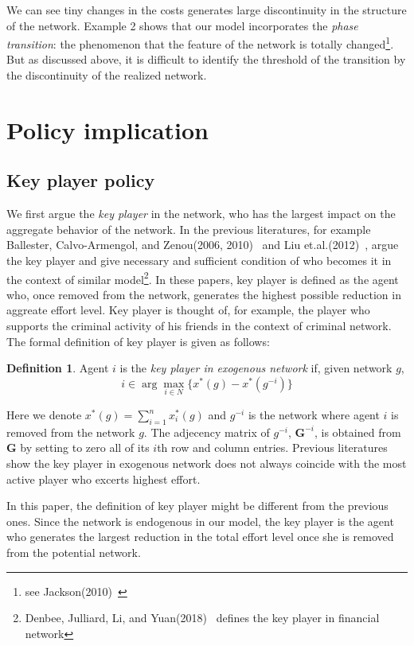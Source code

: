 \documentclass[12pt]{article}
\theoremstyle{definition}
\newtheorem{definition}{Definition}
\newcommand{\bm}[1]{\boldsymbol{#1}}
\begin{document}
We can see tiny changes in the costs generates large discontinuity in the structure of the network.
Example 2 shows that our model incorporates the {\it{phase transition}}: the phenomenon that the feature of the network is totally changed\footnote{see Jackson(2010)~\cite{social}}.
But as discussed above, it is difficult to identify the threshold of the transition by the discontinuity of the realized network.


\section{Policy implication}

\subsection{Key player policy}

We first argue the {\it{key player}} in the network, who has the largest impact on the aggregate behavior of the network.
In the previous literatures, for example Ballester, Calvo-Armengol, and Zenou(2006, 2010)~\cite{whowho, delinquent} and Liu et.al.(2012)~\cite{criminal}, argue the key player and give necessary and sufficient condition of who becomes it in the context of similar model\footnote{Denbee, Julliard, Li, and Yuan(2018)~\cite{denbee} defines the key player in financial network}.
In these papers, key player is defined as the agent who, once removed from the network, generates the highest possible reduction in aggreate effort level.
Key player is thought of, for example, the player who supports the criminal activity of his friends in the context of criminal network.
The formal definition of key player is given as follows:

\begin{definition}
Agent $i$ is the {\it{key player in exogenous network}} if, given network $g$,
\[ i \in \arg \max_{i \in N} \{ x^*(g) - x^*(g^{-i}) \} \]
\end{definition}

Here we denote $x^*(g) = \sum_{i=1}^n x_i^*(g)$ and $g^{-i}$ is the network where agent $i$ is removed from the network $g$.
The adjecency matrix of $g^{-i}$, $\bm{G}^{-i}$, is obtained from $\bm{G}$ by setting to zero all of its $i$th row and column entries.
Previous literatures show the key player in exogenous network does not always coincide with the most active player who excerts highest effort.

In this paper, the definition of key player might be different from the previous ones.
Since the network is endogenous in our model, the key player is the agent who generates the largest reduction in the total effort level once she is removed from the potential network.
\end{document}
